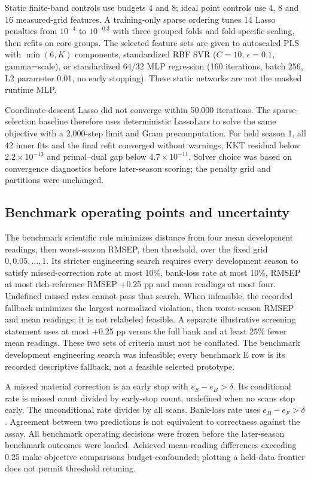 \documentclass[10pt,a4paper]{article}
\begin{document}
Static finite-band controls use budgets 4 and 8; ideal point controls use 4, 8 and 16 measured-grid features. A training-only sparse ordering tunes 14 Lasso penalties from $10^{-4}$ to $10^{-0.3}$ with three grouped folds and fold-specific scaling, then refits on core groups. The selected feature sets are given to autoscaled PLS with $\min(6,K)$ components, standardized RBF SVR ($C=10$, $\epsilon=0.1$, gamma=scale), or standardized 64/32 MLP regression (160 iterations, batch 256, L2 parameter 0.01, no early stopping). These static networks are not the masked runtime MLP.

Coordinate-descent Lasso did not converge within 50,000 iterations. The sparse-selection baseline therefore uses deterministic LassoLars to solve the same objective with a 2,000-step limit and Gram precomputation. For held season 1, all 42 inner fits and the final refit converged without warnings, KKT residual below $2.2\times10^{-13}$ and primal--dual gap below $4.7\times10^{-11}$. Solver choice was based on convergence diagnostics before later-season scoring; the penalty grid and partitions were unchanged.

\subsection{Benchmark operating points and uncertainty}
The benchmark scientific rule minimizes distance from four mean development readings, then worst-season RMSEP, then threshold, over the fixed grid $0,0.05,\ldots,1$. Its stricter engineering search requires every development season to satisfy missed-correction rate at most 10\%, bank-loss rate at most 10\%, RMSEP at most rich-reference RMSEP +0.25 pp and mean readings at most four. Undefined missed rates cannot pass that search. When infeasible, the recorded fallback minimizes the largest normalized violation, then worst-season RMSEP and mean readings; it is not relabeled feasible. A separate illustrative screening statement uses at most +0.25 pp versus the full bank and at least 25\% fewer mean readings. These two sets of criteria must not be conflated. The benchmark development engineering search was infeasible; every benchmark E row is its recorded descriptive fallback, not a feasible selected prototype.

A missed material correction is an early stop with $e_S-e_B>\delta$. Its conditional rate is missed count divided by early-stop count, undefined when no scans stop early. The unconditional rate divides by all scans. Bank-loss rate uses $e_B-e_F>\delta$. Agreement between two predictions is not equivalent to correctness against the assay. All benchmark operating decisions were frozen before the later-season benchmark outcomes were loaded. Achieved mean-reading differences exceeding 0.25 make objective comparisons budget-confounded; plotting a held-data frontier does not permit threshold retuning.
\end{document}
